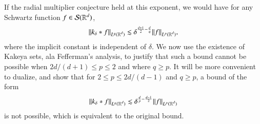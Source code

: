 \begin{comment}
%
\begin{align*}
    k_\delta(|x|) &= 2 \pi |x|^{1 - d/2} \int_{1 - \delta}^{1 + \delta} h \left( \frac{\lambda - 1}{\delta} \right) J_{d/2 - 1}(2 \pi \lambda |x|) \lambda^{d/2}\; d\lambda\\
    &= 2 \pi \delta |x|^{1 - d/2} \int_{-1}^1 h(\lambda) J_{d/2 - 1}(2 \pi (\delta \lambda + 1) |x|) (\delta \lambda + 1)^{d/2}\; d\lambda.
\end{align*}
%
As we have seen, for $s \geq 1$, Bessel function asymptotics tell us that, for any $N > 0$, modulo an error of order $O_N(s^{-N-1/2})$, we can write $J_{d/2-1}(s)$ as a linear combination of terms of the form $s^{-k-1/2} e^{\pm is}$, for $0 \leq k < N-1$. Thus we can write $k_\delta(x)$, modulo an error of order
%
\[ O_N \Bigg( |x|^{- \frac{d-1}{2} - N} \delta^{-1/2-N} \Bigg), \]
%
as a linear combination of terms of the form
%
\[ \delta |x|^{- \frac{d-1}{2} - k} \int_{-1}^1 h(\lambda) (\delta \lambda + 1)^{ \frac{d-1}{2} -k} e^{\pm 2 \pi i (\delta \lambda + 1)}\; d\lambda, \]
%
for $0 \leq k < N-1$. Integrating by parts gives that these terms are, for any $L > 0$,
%
\[ O_L( \delta^{1-L} |x|^{-\frac{d-1}{2} - k - L} ). \]
%
Taking $L$ arbitrarily large gives that
%
\[ \int_{|x| \geq 1/\delta} |k_\delta(x)|^q \lesssim \delta^{q \frac{d+1}{2} - d}. \]
%
For $1 \leq |x| \leq 1/\delta$, we take $L = 0$, which yields that
%
\[ \int_{1 \leq |x| \leq 1/\delta} |k_\delta(x)|^q \lesssim \delta^{q \frac{d+1}{2} - d }. \]
%
Conversely, for $|x| \leq 1$, we use the trivial bound $|k_\delta(x)| \leq \| m_\delta \|_{L^1} \lesssim \delta$. Thus we have
%
\[ \int_{|x| \leq 1} |k_\delta(x)|^q \lesssim \delta^q. \]
%
Putting all these bounds together, together, for $q \geq 2d/(d-1)$ and $\delta \leq 1$, we conclude that
%
\[ \| k_\delta \|_{L^q(\RR^d)} \lesssim \delta^{- \frac{d}{q} + \frac{d+1}{2}}. \]
%
\end{comment}
If the radial multiplier conjecture held at this exponent, we would have for any Schwartz function $f \in \mathcal{S}(\operatorname{\mathbb{R}}^d)$,
%
\[ \| k_\delta * f \|_{L^q(\operatorname{\mathbb{R}}^d)} \lesssim \delta^{\frac{d+1}{2} - \frac{d}{q}} \| f \|_{L^p(\operatorname{\mathbb{R}}^d)}, \]
%
where the implicit constant is independent of $\delta$. We now use the existence of Kakeya sets, ala Fefferman's analysis, to justify that such a bound cannot be possible when $2d/(d+1) \leq p \leq 2$ and where $q \geq p$. It will be more convenient to dualize, and show that for $2 \leq p \leq 2d/(d-1)$ and $q \geq p$, a bound of the form
%
\[ \| k_\delta * f \|_{L^q(\operatorname{\mathbb{R}}^d)} \lesssim \delta^{\frac{d}{p} - \frac{d-1}{2}} \| f \|_{L^p(\operatorname{\mathbb{R}}^d)} \]
%
is not possible, which is equivalent to the original bound.

